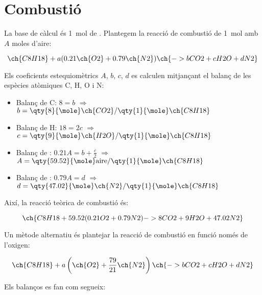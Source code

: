\chapter{Combustió}

\begin{mybox}[title=Determinació de la reacció teòrica de combustió del \textit{n}-octà amb aire]


    La base de càlcul és \qty{1}{\mole} de . Plantegem la reacció de combustió de \qty{1}{\mole} amb $A$ moles d’aire:

    \begin{equation}
        \ch{C8H18} + a(0.21 \ch{O2} + 0.79 \ch{N2}) \ch{-> b CO2 + c H2O + d N2}
    \end{equation}
    
    Els coeficients estequiomètrics $A$, $b$, $c$, $d$ es calculen mitjançant el balanç de les espècies atòmiques C, H, O i N:
    
    \begin{itemize}
        \item Balanç de C: \quad $8 = b$ \quad $\Rightarrow$ \quad $b = \qty{8}{\mole} \ch{CO2}/\qty{1}{\mole} \ch{C8H18}$
        \item Balanç de H: \quad $18 = 2c$ \quad $\Rightarrow$ \quad $c = \qty{9}{\mole} \ch{H2O}/\qty{1}{\mole} \ch{C8H18}$
        \item Balanç de : \quad $0.21A = b + \frac{c}{2}$ \quad $\Rightarrow$ \quad $A = \qty{59.52}{\mole} \text{aire}/\qty{1}{\mole} \ch{C8H18}$
        \item Balanç de : \quad $0.79A = d$ \quad $\Rightarrow$ \quad $d = \qty{47.02}{\mole} \ch{N2}/\qty{1}{\mole} \ch{C8H18}$
    \end{itemize}
    
    Així, la reacció teòrica de combustió és:
    
    \begin{equation}
        \ch{C8H18 + 59.52( 0.21 O2 + 0.79 N2 ) -> 8 CO2 + 9 H2O + 47.02 N2}
    \end{equation}
    
    Un mètode alternatiu és plantejar la reacció de combustió en funció només de l'oxigen:
    
    \begin{equation}
        \ch{C8H18} + a \left( \ch{O2} + \frac{79}{21} \ch{N2}\right) \ch{-> b CO2 + c H2O + d N2}
    \end{equation}
    
    Els balanços es fan com segueix:
    

\end{mybox}
